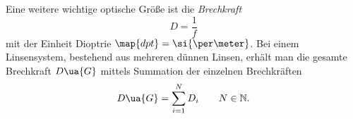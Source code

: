 Eine weitere wichtige optische Größe ist die \emph{Brechkraft}
\begin{equation}
  \label{eq: brechkraft}
  D=\frac{1}{f}
\end{equation}
mit der Einheit Dioptrie $\map{dpt}=\si{\per \meter}$.
Bei einem Linsensystem, bestehend aus mehreren dünnen Linsen, erhält man die gesamte
Brechkraft $D\ua{G}$ mittels Summation der einzelnen Brechkräften
\begin{equation*}
  D\ua{G}=\sum_{i=1}^{N}D_i \qquad N\in\mathbb{N}.
\end{equation*}
